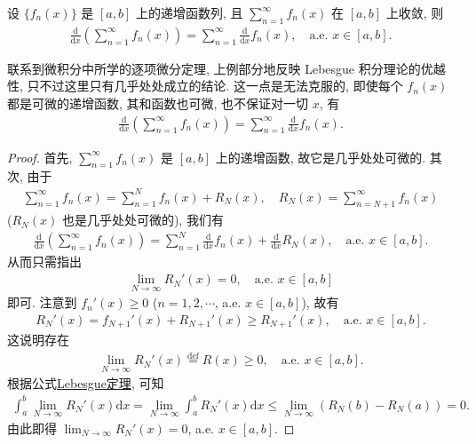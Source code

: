 \documentclass[../../main.tex]{subfiles}%
\begin{document}
\begin{theorem}\label{theorem:实变函数--Fubini 逐项微分定理}
设 $\{f_n(x)\}$ 是 $[a,b]$ 上的递增函数列, 且 $\sum_{n=1}^\infty f_n(x)$ 在 $[a,b]$ 上收敛, 则
\begin{align*}
\frac{\mathrm{d}}{\mathrm{d}x}\left(\sum_{n=1}^\infty f_n(x)\right) = \sum_{n=1}^\infty \frac{\mathrm{d}}{\mathrm{d}x}f_n(x), \quad \text{a.e. } x\in[a,b].
\end{align*}
\end{theorem}
\begin{remark}
联系到微积分中所学的逐项微分定理, 上例部分地反映 Lebesgue 积分理论的优越性, 只不过这里只有几乎处处成立的结论. 这一点是无法克服的, 即使每个 $f_n(x)$ 都是可微的递增函数, 其和函数也可微, 也不保证对一切 $x$, 有
\begin{align*}
\frac{\mathrm{d}}{\mathrm{d}x}\left(\sum_{n=1}^\infty f_n(x)\right) = \sum_{n=1}^\infty \frac{\mathrm{d}}{\mathrm{d}x}f_n(x).
\end{align*}
\end{remark}
\begin{proof}

首先, $\sum_{n=1}^\infty f_n(x)$ 是 $[a,b]$ 上的递增函数, 故它是几乎处处可微的. 其次, 由于
\begin{align*}
\sum_{n=1}^\infty f_n(x) = \sum_{n=1}^N f_n(x) + R_N(x), \quad R_N(x) = \sum_{n=N+1}^\infty f_n(x)
\end{align*}
($R_N(x)$ 也是几乎处处可微的), 我们有
\begin{align*}
\frac{\mathrm{d}}{\mathrm{d}x}\left(\sum_{n=1}^\infty f_n(x)\right) = \sum_{n=1}^N \frac{\mathrm{d}}{\mathrm{d}x}f_n(x) + \frac{\mathrm{d}}{\mathrm{d}x}R_N(x), \quad \text{a.e. } x\in[a,b].
\end{align*}
从而只需指出
\begin{align*}
\lim_{N\to\infty} R_N'(x) = 0, \quad \text{a.e. } x\in[a,b]
\end{align*}
即可. 注意到 $f_n'(x)\geqslant 0$ ($n=1,2,\cdots$, a.e. $x\in[a,b]$), 故有
\begin{align*}
R_N'(x) = f_{N+1}'(x) + R_{N+1}'(x) \geqslant R_{N+1}'(x), \quad \text{a.e. } x\in[a,b].
\end{align*}
这说明存在
\begin{align*}
\lim_{N\to\infty} R_N'(x) \stackrel{\text{def}}{=} R(x) \geqslant 0, \quad \text{a.e. } x\in[a,b].
\end{align*}
根据公式\hyperref[theorem:Lebesgue定理--实变函数]{Lebesgue定理}, 可知
\begin{align*}
\int_a^b \lim_{N\to\infty} R_N'(x)\mathrm{d}x = \lim_{N\to\infty} \int_a^b R_N'(x)\mathrm{d}x 
\leqslant \lim_{N\to\infty} (R_N(b)-R_N(a)) = 0.
\end{align*}
由此即得 $\lim_{N\to\infty} R_N'(x) = 0$, a.e. $x\in[a,b]$.

\end{proof}
\end{document}
